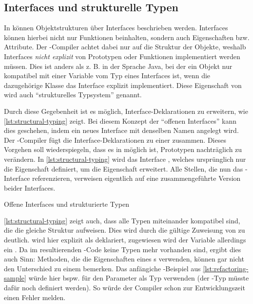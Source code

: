 \documentclass[a4paper]{scrartcl}
\begin{document}
\subsection{Interfaces und strukturelle Typen}
In \ts{} können Objektstrukturen über Interfaces beschrieben werden.
Interfaces können hierbei nicht nur Funktionen beinhalten, sondern auch Eigenschaften bzw. Attribute.
Der \ts-Compiler achtet dabei nur auf die Struktur der Objekte, weshalb Interfaces \textit{nicht explizit} von Prototypen oder Funktionen implementiert werden müssen.
Dies ist anders als z. B. in der Sprache Java, bei der ein Objekt nur kompatibel mit einer Variable vom Typ eines Interfaces ist, wenn die dazugehörige Klasse das Interface explizit implementiert.
Diese Eigenschaft von \ts{} wird auch \enquote{strukturelles Typsystem} genannt.

Durch diese Gegebenheit ist es möglich, Interface-Deklarationen zu erweitern, wie \autoref{lst:structural-typing} zeigt.
Bei diesem Konzept der \enquote{offenen Interfaces} kann dies geschehen, indem ein neues Interface mit denselben Namen angelegt wird.
Der \ts-Compiler fügt die Interface-Deklarationen zu einer zusammen.
Dieses Vorgehen soll wiederspiegeln, dass es in \js{} möglich ist, Prototypen nachträglich zu verändern.
In \autoref{lst:structural-typing} wird das Interface , welches ursprünglich nur die Eigenschaft  definiert, um die Eigenschaft  erweitert.
Alle Stellen, die nun das -Interface referenzieren, verweisen eigentlich auf eine zusammengeführte Version beider Interfaces.

\begin{listing}[htb]
	\centering
	\vspace*{-7mm}
	\caption{Offene Interfaces und strukturierte Typen}
	\label{lst:structural-typing}
\end{listing}

\autoref{lst:structural-typing} zeigt auch, dass alle Typen miteinander kompatibel sind, die die gleiche Struktur aufweisen.
Dies wird durch die gültige Zuweisung von  zu  deutlich.
 wird hier explizit als  deklariert, zugewiesen wird der Variable allerdings ein .
Da im resultierenden \js-Code keine Typen mehr vorhanden sind, ergibt dies auch Sinn:
Methoden, die die Eigenschaften eines s verwenden, können gar nicht den Unterschied zu einem  bemerken.
Das anfängiche \js-Beispiel aus \autoref{lst:refactoring-sample} würde hier bspw. für den Parameter  als Typ  verwenden (der -Typ müsste dafür noch definiert werden).
So würde der Compiler schon zur Entwicklungszeit einen Fehler melden.
\end{document}
